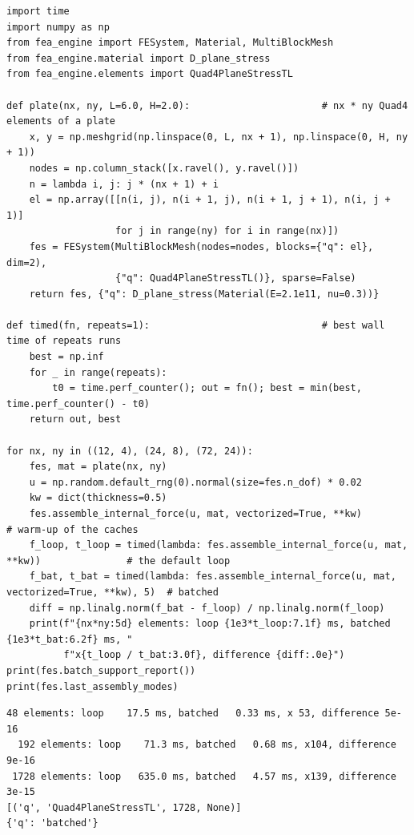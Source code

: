 \begin{lstlisting}[caption={The default element loop against batched assembly of the internal force of a plate (run with the package on the path).},label={lst:bk-try}]
import time
import numpy as np
from fea_engine import FESystem, Material, MultiBlockMesh
from fea_engine.material import D_plane_stress
from fea_engine.elements import Quad4PlaneStressTL

def plate(nx, ny, L=6.0, H=2.0):                       # nx * ny Quad4 elements of a plate
    x, y = np.meshgrid(np.linspace(0, L, nx + 1), np.linspace(0, H, ny + 1))
    nodes = np.column_stack([x.ravel(), y.ravel()])
    n = lambda i, j: j * (nx + 1) + i
    el = np.array([[n(i, j), n(i + 1, j), n(i + 1, j + 1), n(i, j + 1)]
                   for j in range(ny) for i in range(nx)])
    fes = FESystem(MultiBlockMesh(nodes=nodes, blocks={"q": el}, dim=2),
                   {"q": Quad4PlaneStressTL()}, sparse=False)
    return fes, {"q": D_plane_stress(Material(E=2.1e11, nu=0.3))}

def timed(fn, repeats=1):                              # best wall time of repeats runs
    best = np.inf
    for _ in range(repeats):
        t0 = time.perf_counter(); out = fn(); best = min(best, time.perf_counter() - t0)
    return out, best

for nx, ny in ((12, 4), (24, 8), (72, 24)):
    fes, mat = plate(nx, ny)
    u = np.random.default_rng(0).normal(size=fes.n_dof) * 0.02
    kw = dict(thickness=0.5)
    fes.assemble_internal_force(u, mat, vectorized=True, **kw)            # warm-up of the caches
    f_loop, t_loop = timed(lambda: fes.assemble_internal_force(u, mat, **kw))               # the default loop
    f_bat, t_bat = timed(lambda: fes.assemble_internal_force(u, mat, vectorized=True, **kw), 5)  # batched
    diff = np.linalg.norm(f_bat - f_loop) / np.linalg.norm(f_loop)
    print(f"{nx*ny:5d} elements: loop {1e3*t_loop:7.1f} ms, batched {1e3*t_bat:6.2f} ms, "
          f"x{t_loop / t_bat:3.0f}, difference {diff:.0e}")
print(fes.batch_support_report())
print(fes.last_assembly_modes)
\end{lstlisting}

\begin{lstlisting}[numbers=none,language={},keywordstyle={},commentstyle={},frame=single,aboveskip=2pt]
   48 elements: loop    17.5 ms, batched   0.33 ms, x 53, difference 5e-16
  192 elements: loop    71.3 ms, batched   0.68 ms, x104, difference 9e-16
 1728 elements: loop   635.0 ms, batched   4.57 ms, x139, difference 3e-15
[('q', 'Quad4PlaneStressTL', 1728, None)]
{'q': 'batched'}
\end{lstlisting}

